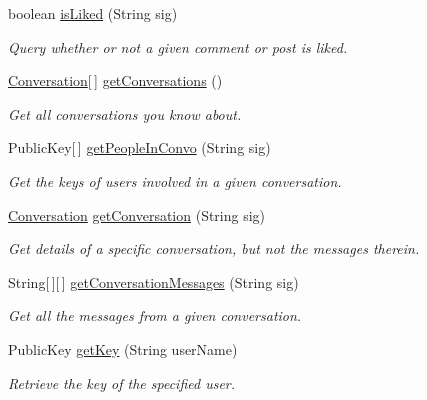 \begin{DoxyCompactItemize}
boolean \hyperlink{classballmerpeak_1_1turtlenet_1_1server_1_1Database_a76fdbae3c50e5e2fc64d9973de7e08d9}{is\-Liked} (String sig)
\begin{DoxyCompactList}\small\item\em Query whether or not a given comment or post is liked. \end{DoxyCompactList}\item 
\hyperlink{classballmerpeak_1_1turtlenet_1_1shared_1_1Conversation}{Conversation}\mbox{[}$\,$\mbox{]} \hyperlink{classballmerpeak_1_1turtlenet_1_1server_1_1Database_ab81803b4c6efc49a774faaba66add16d}{get\-Conversations} ()
\begin{DoxyCompactList}\small\item\em Get all conversations you know about. \end{DoxyCompactList}\item 
Public\-Key\mbox{[}$\,$\mbox{]} \hyperlink{classballmerpeak_1_1turtlenet_1_1server_1_1Database_ab4048f6c37cc47a31838aa992398cdac}{get\-People\-In\-Convo} (String sig)
\begin{DoxyCompactList}\small\item\em Get the keys of users involved in a given conversation. \end{DoxyCompactList}\item 
\hyperlink{classballmerpeak_1_1turtlenet_1_1shared_1_1Conversation}{Conversation} \hyperlink{classballmerpeak_1_1turtlenet_1_1server_1_1Database_a85b0c44b683cbbab3f966ce7b266f837}{get\-Conversation} (String sig)
\begin{DoxyCompactList}\small\item\em Get details of a specific conversation, but not the messages therein. \end{DoxyCompactList}\item 
String\mbox{[}$\,$\mbox{]}\mbox{[}$\,$\mbox{]} \hyperlink{classballmerpeak_1_1turtlenet_1_1server_1_1Database_ac65176a79a8e7433b18e8c98dbc02689}{get\-Conversation\-Messages} (String sig)
\begin{DoxyCompactList}\small\item\em Get all the messages from a given conversation. \end{DoxyCompactList}\item 
Public\-Key \hyperlink{classballmerpeak_1_1turtlenet_1_1server_1_1Database_a67893a85c22e9e5b5a039f1900817df5}{get\-Key} (String user\-Name)
\begin{DoxyCompactList}\small\item\em Retrieve the key of the specified user. \end{DoxyCompactList}\item 

\end{DoxyCompactItemize}

